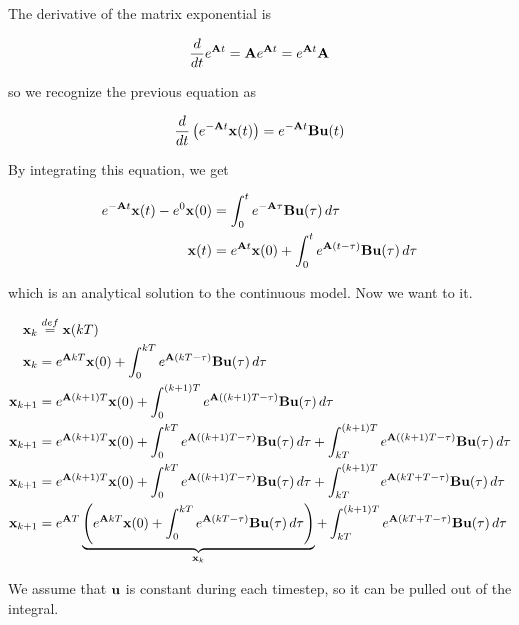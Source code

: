 The derivative of the matrix exponential is

\begin{equation*}
  \frac{d}{dt}e^{\mathbf{A}t} = \mathbf{A}e^{\mathbf{A}t} = e^{\mathbf{A}t}\mathbf{A}
\end{equation*}

so we recognize the previous equation as

\begin{equation*}
  \frac{d}{dt}\left(e^{-\mathbf{A}t}\mathbf{x}(t)\right) =
    e^{-\mathbf{A}t}\mathbf{B}\mathbf{u}(t)
\end{equation*}

By integrating this equation, we get

\begin{align*}
  e^{-\mathbf{A}t}\mathbf{x}(t) - e^0\mathbf{x}(0) &=
    \int_0^t e^{-\mathbf{A}\tau}\mathbf{B}\mathbf{u}(\tau) \,d\tau \\
  \mathbf{x}(t) &= e^{\mathbf{A}t}\mathbf{x}(0) +
    \int_0^t e^{\mathbf{A}(t - \tau)}\mathbf{B}\mathbf{u}(\tau) \,d\tau
\end{align*}

which is an analytical solution to the continuous \gls{model}. Now we want to
 it.

\begin{align*}
  \mathbf{x}_k &\stackrel{def}{=} \mathbf{x}(kT) \\
  \mathbf{x}_k &= e^{\mathbf{A}kT}\mathbf{x}(0) +
    \int_0^{kT} e^{\mathbf{A}(kT - \tau)}\mathbf{B}\mathbf{u}(\tau) \,d\tau \\
  \mathbf{x}_{k+1} &= e^{\mathbf{A}(k + 1)T}\mathbf{x}(0) +
    \int_0^{(k + 1)T} e^{\mathbf{A}((k + 1)T - \tau)}\mathbf{B}\mathbf{u}(\tau) \,d\tau
    \\
  \mathbf{x}_{k+1} &= e^{\mathbf{A}(k + 1)T}\mathbf{x}(0) +
    \int_0^{kT} e^{\mathbf{A}((k + 1)T - \tau)}\mathbf{B}\mathbf{u}(\tau) \,d\tau +
    \int_{kT}^{(k + 1)T} e^{\mathbf{A}((k + 1)T - \tau)}\mathbf{B}\mathbf{u}(\tau)
    \,d\tau \\
  \mathbf{x}_{k+1} &= e^{\mathbf{A}(k + 1)T}\mathbf{x}(0) +
    \int_0^{kT} e^{\mathbf{A}((k + 1)T - \tau)}\mathbf{B}\mathbf{u}(\tau) \,d\tau +
    \int_{kT}^{(k + 1)T} e^{\mathbf{A}(kT + T - \tau)}\mathbf{B}\mathbf{u}(\tau) \,d\tau
    \\
  \mathbf{x}_{k+1} &= e^{\mathbf{A}T} \underbrace{\left(e^{\mathbf{A}kT}\mathbf{x}(0) +
    \int_0^{kT} e^{\mathbf{A}(kT - \tau)}\mathbf{B}\mathbf{u}(\tau)
    \,d\tau\right)}_{\mathbf{x}_k} +
    \int_{kT}^{(k + 1)T} e^{\mathbf{A}(kT + T - \tau)}\mathbf{B}\mathbf{u}(\tau) \,d\tau
\end{align*}

We assume that $\mathbf{u}$ is constant during each timestep, so it can be pulled
out of the integral.

